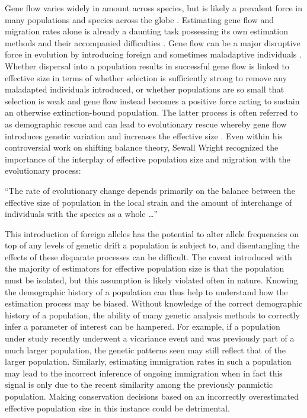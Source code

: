 Gene flow varies widely in amount across species, but is likely a prevalent force in many populations and species across the globe \citep{Slatkin:1985, Slatkin:1987}. 
Estimating gene flow and migration rates alone is already a daunting task possessing its own estimation methods and their accompanied difficulties \citep{Beerli:2001, Hey:2004, Kuhner:2006, Whitlock:1999}. Gene flow can be a major disruptive force in evolution by introducing foreign and sometimes maladaptive individuals \citep{Slatkin:1987}. Whether dispersal into a population results in successful gene flow is linked to effective size in terms of whether selection is sufficiently strong to remove any maladapted individuals introduced, or whether populations are so small that selection is weak and gene flow instead becomes a positive force acting to sustain an otherwise extinction-bound population. The latter process is often referred to as demographic rescue and can lead to evolutionary rescue whereby gene flow introduces genetic variation and increases the effective size \citep{Carlson:2014, Bell:2013}. Even within his controversial work on shifting balance theory, Sewall Wright recognized the importance of the interplay of effective population size and migration with the evolutionary process: %
\begin{quoteshrink}
  ``The rate of evolutionary change depends primarily on the balance between the effective size of population in the local strain and the amount of interchange of individuals with the species as a whole \dots''
  \hfill\citet{Wright:1930}
\end{quoteshrink}
This introduction of foreign alleles has the potential to alter allele frequencies on top of any levels of genetic drift a population is subject to, and disentangling the effects of these disparate processes can be difficult. The caveat introduced with the majority of estimators for effective population size is that the population must be isolated, but this assumption is likely violated often in nature. Knowing the demographic history of a population can thus help to understand how the estimation process may be biased. Without knowledge of the correct demographic history of a population, the ability of many genetic analysis methods to correctly infer a parameter of interest can be hampered. For example, if a population under study recently underwent a vicariance event and was previously part of a much larger population, the genetic patterns seen may still reflect that of the larger population. Similarly, estimating immigration rates in such a population may lead to the incorrect inference of ongoing immigration when in fact this signal is only due to the recent similarity among the previously panmictic population. Making conservation decisions based on an incorrectly overestimated effective population size in this instance could be detrimental.

